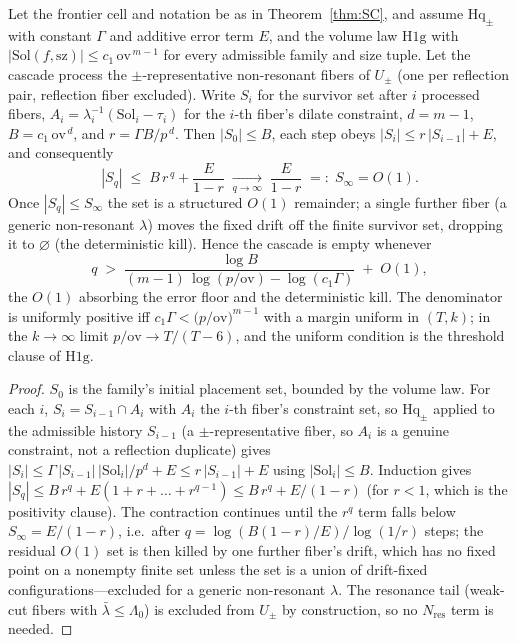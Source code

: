 \begin{proposition}\label{prop:Hq}
Let the frontier cell and notation be as in Theorem~\ref{thm:SC}, and assume
$\mathrm{Hq}_\pm$ with constant $\Gamma$ and additive error term $E$, and the
volume law $\mathrm{H1g}$ with
$|\mathrm{Sol}(f,\mathrm{sz})|\le c_1\,\mathrm{ov}^{\,m-1}$ for every
admissible family and size tuple. Let the cascade process the
$\pm$-representative non-resonant fibers of $U_\pm$ (one per reflection pair,
reflection fiber excluded). Write $S_i$ for the survivor set after $i$
processed fibers, $A_i=\lambda_i^{-1}(\mathrm{Sol}_i-\tau_i)$ for the $i$-th
fiber's dilate constraint, $d=m-1$, $B=c_1\,\mathrm{ov}^{\,d}$, and
$r=\Gamma B/p^{\,d}$. Then $|S_0|\le B$, each step obeys
$|S_i|\le r\,|S_{i-1}|+E$, and consequently
\[
|S_q|\;\le\;B\,r^{\,q}+\frac{E}{1-r}\;\xrightarrow[q\to\infty]{}\;\frac{E}{1-r}
\;=:\;S_\infty=O(1).
\]
Once $|S_q|\le S_\infty$ the set is a structured $O(1)$ remainder; a single
further fiber (a generic non-resonant $\lambda$) moves the fixed drift off
the finite survivor set, dropping it to $\varnothing$ (the deterministic
kill). Hence the cascade is empty whenever
\[
q\;>\;\frac{\log B}{(m-1)\,\log(p/\mathrm{ov})-\log(c_1\Gamma)}\;+\;O(1),
\]
the $O(1)$ absorbing the error floor and the deterministic kill. The
denominator is uniformly positive iff
$c_1\Gamma<\bigl(p/\mathrm{ov}\bigr)^{m-1}$ with a margin uniform in
$(T,k)$; in the $k\to\infty$ limit $p/\mathrm{ov}\to T/(T-6)$, and the
uniform condition is the threshold clause of $\mathrm{H1g}$.
\end{proposition}

\begin{proof}
$S_0$ is the family's initial placement set, bounded by the volume law.
For each $i$, $S_i=S_{i-1}\cap A_i$ with $A_i$ the $i$-th fiber's
constraint set, so $\mathrm{Hq}_\pm$ applied to the admissible history
$S_{i-1}$ (a $\pm$-representative fiber, so $A_i$ is a genuine constraint,
not a reflection duplicate) gives
$|S_i|\le\Gamma\,|S_{i-1}|\,|\mathrm{Sol}_i|/p^{d}+E\le r\,|S_{i-1}|+E$
using $|\mathrm{Sol}_i|\le B$. Induction gives
$|S_q|\le B\,r^{q}+E(1+r+\dots+r^{q-1})\le B\,r^{q}+E/(1-r)$ (for $r<1$,
which is the positivity clause). The contraction continues until the
$r^{q}$ term falls below $S_\infty=E/(1-r)$, i.e.\ after
$q=\log(B(1-r)/E)/\log(1/r)$ steps; the residual $O(1)$ set is then killed
by one further fiber's drift, which has no fixed point on a nonempty finite
set unless the set is a union of drift-fixed configurations---excluded for a
generic non-resonant $\lambda$. The resonance tail (weak-cut fibers with
$\bar\lambda\le\Lambda_0$) is excluded from $U_\pm$ by construction, so no
$N_{\mathrm{res}}$ term is needed.
\end{proof}

